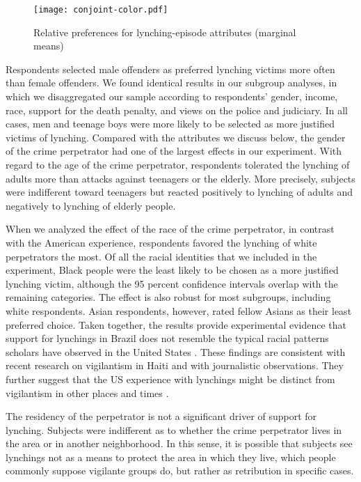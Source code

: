 \documentclass[12pt,a4paper]{article}
\begin{document}
\begin{figure}[ht]
\texttt{[image: conjoint-color.pdf]}
\caption{Relative preferences for lynching-episode attributes (marginal means)}
\centering
\label{fig:exp01}
\end{figure}

Respondents selected male offenders as preferred lynching victims more often
than female offenders. We found identical results in our subgroup analyses, in
which we disaggregated our sample according to respondents' gender, income,
race, support for the death penalty, and views on the police and judiciary. In
all cases, men and teenage boys were more likely to be selected as more
justified victims of lynching. Compared with the attributes we discuss below,
the gender of the crime perpetrator had one of the largest effects in our
experiment. With regard to the age of the crime perpetrator, respondents
tolerated the lynching of adults more than attacks against teenagers or the
elderly. More precisely, subjects were indifferent toward teenagers but reacted
positively to lynching of adults and negatively to lynching of elderly people.

When we analyzed the effect of the race of the crime perpetrator, in contrast
with the American experience, respondents favored the lynching of white
perpetrators the most. Of all the racial identities that we included in the
experiment, Black people were the least likely to be chosen as a more justified
lynching victim, although the 95 percent confidence intervals overlap with the
remaining categories. The effect is also robust for most subgroups, including
white respondents. Asian respondents, however, rated fellow Asians as their
least preferred choice. Taken together, the results provide experimental
evidence that support for lynchings in Brazil does not resemble the typical
racial patterns scholars have observed in the United States
\citep{dray2003hands, obert2018keeping, seguin2019national}. These findings are
consistent with recent research on vigilantism in Haiti
\citep{jung2020lynching} and with journalistic observations. They further
suggest that the US experience with lynchings might be distinct from
vigilantism in other places and times \citep{oliveira2016mob}. 

The residency of the perpetrator is not a significant driver of support for
lynching. Subjects were indifferent as to whether the crime perpetrator lives
in the area or in another neighborhood. In this sense, it is possible that
subjects see lynchings not as a means to protect the area in which they live,
which people commonly suppose vigilante groups do, but rather as retribution in
specific cases. 
\end{document}
